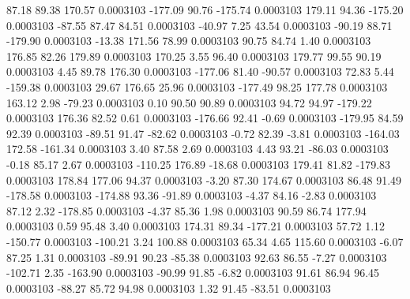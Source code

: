        87.18       89.38      170.57     0.0003103
     -177.09       90.76     -175.74     0.0003103
      179.11       94.36     -175.20     0.0003103
      -87.55       87.47       84.51     0.0003103
      -40.97        7.25       43.54     0.0003103
      -90.19       88.71     -179.90     0.0003103
      -13.38      171.56       78.99     0.0003103
       90.75       84.74        1.40     0.0003103
      176.85       82.26      179.89     0.0003103
      170.25        3.55       96.40     0.0003103
      179.77       99.55       90.19     0.0003103
        4.45       89.78      176.30     0.0003103
     -177.06       81.40      -90.57     0.0003103
       72.83        5.44     -159.38     0.0003103
       29.67      176.65       25.96     0.0003103
     -177.49       98.25      177.78     0.0003103
      163.12        2.98      -79.23     0.0003103
        0.10       90.50       90.89     0.0003103
       94.72       94.97     -179.22     0.0003103
      176.36       82.52        0.61     0.0003103
     -176.66       92.41       -0.69     0.0003103
     -179.95       84.59       92.39     0.0003103
      -89.51       91.47      -82.62     0.0003103
       -0.72       82.39       -3.81     0.0003103
     -164.03      172.58     -161.34     0.0003103
        3.40       87.58        2.69     0.0003103
        4.43       93.21      -86.03     0.0003103
       -0.18       85.17        2.67     0.0003103
     -110.25      176.89      -18.68     0.0003103
      179.41       81.82     -179.83     0.0003103
      178.84      177.06       94.37     0.0003103
       -3.20       87.30      174.67     0.0003103
       86.48       91.49     -178.58     0.0003103
     -174.88       93.36      -91.89     0.0003103
       -4.37       84.16       -2.83     0.0003103
       87.12        2.32     -178.85     0.0003103
       -4.37       85.36        1.98     0.0003103
       90.59       86.74      177.94     0.0003103
        0.59       95.48        3.40     0.0003103
      174.31       89.34     -177.21     0.0003103
       57.72        1.12     -150.77     0.0003103
     -100.21        3.24      100.88     0.0003103
       65.34        4.65      115.60     0.0003103
       -6.07       87.25        1.31     0.0003103
      -89.91       90.23      -85.38     0.0003103
       92.63       86.55       -7.27     0.0003103
     -102.71        2.35     -163.90     0.0003103
      -90.99       91.85       -6.82     0.0003103
       91.61       86.94       96.45     0.0003103
      -88.27       85.72       94.98     0.0003103
        1.32       91.45      -83.51     0.0003103
